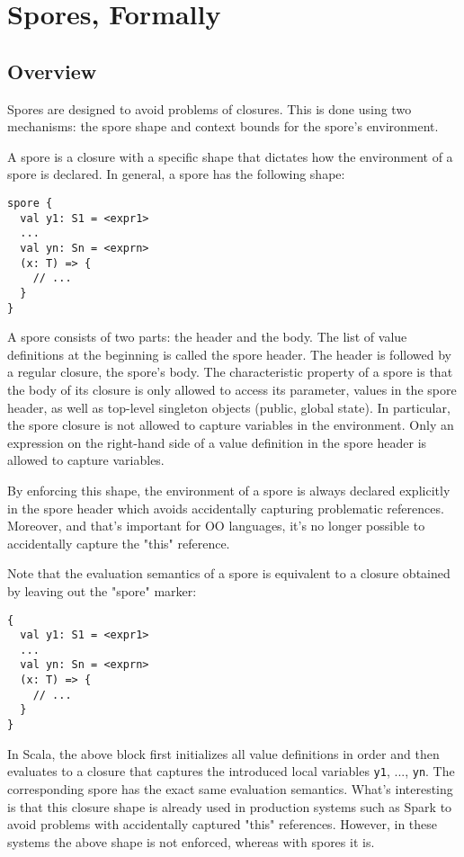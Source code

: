 \appendix
\chapter{Spores, Formally}

\section{Overview}

Spores are designed to avoid problems of closures. This is done using two mechanisms: the spore shape and context bounds for the spore's environment.

A spore is a closure with a specific shape that dictates how the environment of a spore is declared. In general, a spore has the following shape:

\begin{verbatim}
spore {
  val y1: S1 = <expr1>
  ...
  val yn: Sn = <exprn>
  (x: T) => {
    // ...
  }
}
\end{verbatim}

A spore consists of two parts: the header and the body. The list of value definitions at the beginning is called the spore header. The header is followed by a regular closure, the spore's body. The characteristic property of a spore is that the body of its closure is only allowed to access its parameter, values in the spore header, as well as top-level singleton objects (public, global state). In particular, the spore closure is not allowed to capture variables in the environment. Only an expression on the right-hand side of a value definition in the spore header is allowed to capture variables.

By enforcing this shape, the environment of a spore is always declared explicitly in the spore header which avoids accidentally capturing problematic references. Moreover, and that's important for OO languages, it's no longer possible to accidentally capture the "this" reference.

Note that the evaluation semantics of a spore is equivalent to a closure obtained by leaving out the "spore" marker:

\begin{verbatim}
{
  val y1: S1 = <expr1>
  ...
  val yn: Sn = <exprn>
  (x: T) => {
    // ...
  }
}
\end{verbatim}

In Scala, the above block first initializes all value definitions in order and then evaluates to a closure that captures the introduced local variables \verb|y1|, ..., \verb|yn|. The corresponding spore has the exact same evaluation semantics. What's interesting is that this closure shape is already used in production systems such as Spark to avoid problems with accidentally captured "this" references. However, in these systems the above shape is not enforced, whereas with spores it is.

